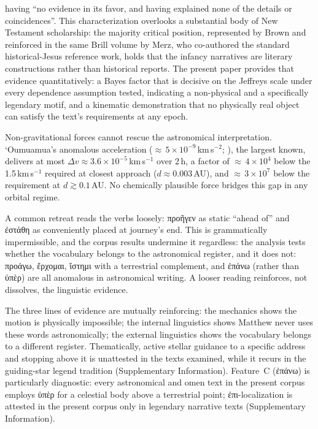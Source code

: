 \documentclass[sn-nature]{sn-jnl}
\newcommand{\grk}[1]{{\fontencoding{LGR}\selectfont #1}}
\newcommand{\grk}[1]{{\greekfont #1}}
\begin{document}
having ``no evidence in its favor, and having explained none of the details or
coincidences''\cite{schaefer2015molnar}.
This characterization overlooks a substantial body of New Testament scholarship: the majority critical position, 
represented by Brown\cite{brown1993} and reinforced in the same Brill volume by Merz, who co-authored the standard 
historical-Jesus reference work\cite{merz2015}, holds that the infancy narratives are literary constructions rather than historical reports.
The present paper provides that evidence quantitatively: a Bayes factor that is
decisive on the Jeffreys scale under every dependence assumption tested,
indicating a non-physical and a specifically legendary motif,
and a kinematic demonstration that no physically real object can satisfy the text's requirements at any epoch.

Non-gravitational forces cannot rescue the astronomical interpretation.
`Oumuamua's anomalous acceleration (${\approx}\,5\times10^{-9}$\,km\,s$^{-2}$;
\cite{micheli2018}), the largest known, delivers at most
$\Delta v \approx 3.6\times10^{-5}$\,km\,s$^{-1}$ over 2\,h, a factor of
${\approx}\,4\times10^4$ below the 1.5\,km\,s$^{-1}$ required at closest
approach ($d\approx0.003$\,AU), and ${\approx}\,3\times10^7$ below the
requirement at $d \gtrsim 0.1$\,AU. No chemically plausible force bridges
this gap in any orbital regime.

A common retreat reads the verbs loosely: \grk{προῆγεν} as static
``ahead of'' and \grk{ἐστάθη} as conveniently placed at journey's end.
This is grammatically impermissible\cite{adair2013star}, and the corpus
results undermine it regardless: the analysis tests whether the vocabulary
belongs to the astronomical register, and it does not: \grk{προάγω},
\grk{ἔρχομαι}, \grk{ἵστημι} with a terrestrial complement, and
\grk{ἐπάνω} (rather than \grk{ὑπὲρ}) are all anomalous in astronomical
writing. A looser reading reinforces, not dissolves, the linguistic evidence.

The three lines of evidence are mutually reinforcing: the mechanics shows the
motion is physically impossible; the internal linguistics shows Matthew never
uses these words astronomically; the external linguistics shows the vocabulary
belongs to a different register. Thematically, active stellar guidance to a
specific address and stopping above it is unattested in the texts examined,
while it recurs in the guiding-star legend tradition (Supplementary
Information). Feature~C (\grk{ἐπάνω}) is particularly diagnostic: every
astronomical and omen text in the present corpus employs \grk{ὑπὲρ} for a
celestial body above a terrestrial point; \grk{ἐπι}-localization is attested
in the present corpus only in legendary narrative texts (Supplementary
Information).
\end{document}
